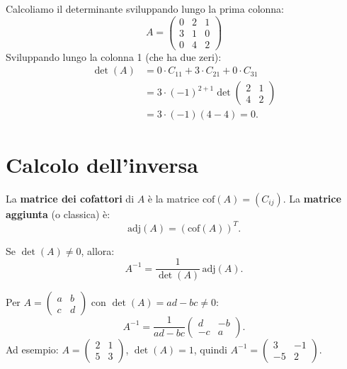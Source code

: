 \begin{examplebox}
Calcoliamo il determinante sviluppando lungo la prima colonna:
\[ A = \begin{pmatrix} 0 & 2 & 1 \\ 3 & 1 & 0 \\ 0 & 4 & 2 \end{pmatrix} \]
Sviluppando lungo la colonna 1 (che ha due zeri):
\begin{align*}
    \det(A) &= 0 \cdot C_{11} + 3 \cdot C_{21} + 0 \cdot C_{31} \\
            &= 3 \cdot (-1)^{2+1} \det\begin{pmatrix} 2 & 1 \\ 4 & 2 \end{pmatrix} \\
            &= 3 \cdot (-1)(4 - 4) = 0.
\end{align*}
\end{examplebox}

\section{Calcolo dell'inversa}
\label{sec:inversa}

\begin{definitionbox}
La \textbf{matrice dei cofattori} di $A$ è la matrice $\text{cof}(A) = (C_{ij})$. La \textbf{matrice aggiunta} (o classica) è:
\[ \text{adj}(A) = (\text{cof}(A))^T. \]
\end{definitionbox}

\begin{theorembox}
\label{thm:inversa-aggiunta}
Se $\det(A) \neq 0$, allora:
\[ A^{-1} = \frac{1}{\det(A)} \, \text{adj}(A). \]
\end{theorembox}

\begin{examplebox}
Per $A = \begin{pmatrix} a & b \\ c & d \end{pmatrix}$ con $\det(A) = ad - bc \neq 0$:
\[ A^{-1} = \frac{1}{ad - bc} \begin{pmatrix} d & -b \\ -c & a \end{pmatrix}. \]
Ad esempio: $A = \begin{pmatrix} 2 & 1 \\ 5 & 3 \end{pmatrix}$, $\det(A) = 1$, quindi $A^{-1} = \begin{pmatrix} 3 & -1 \\ -5 & 2 \end{pmatrix}$.
\end{examplebox}

